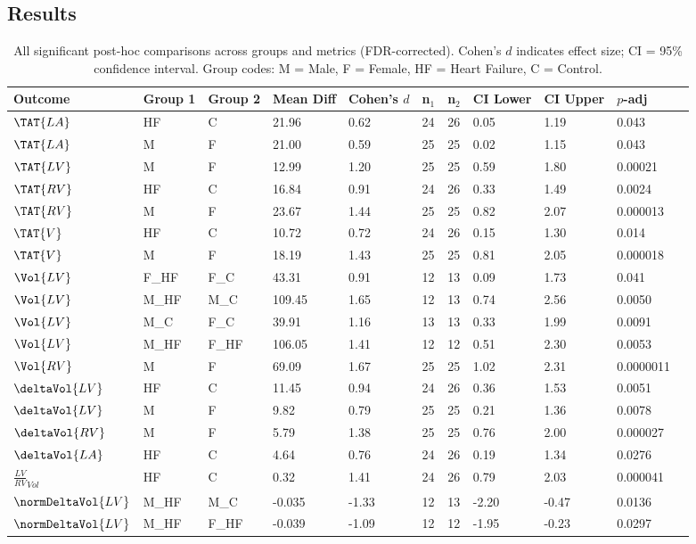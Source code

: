 \subsection{Results}
\begin{landscape}
\begin{table}[ht]
\centering
\caption{All significant post-hoc comparisons across groups and metrics (FDR-corrected). Cohen’s $d$ indicates effect size; CI = 95\% confidence interval. Group codes: M = Male, F = Female, HF = Heart Failure, C = Control.}
\begin{tabular}{lllllllllll}
\toprule
\textbf{Outcome} & \textbf{Group 1} & \textbf{Group 2} & \textbf{Mean Diff} & \textbf{Cohen's $d$} & \textbf{n$_1$} & \textbf{n$_2$} & \textbf{CI Lower} & \textbf{CI Upper} & \textbf{$p$-adj} \\
\midrule
$\TAT{LA}$ & HF & C & 21.96 & 0.62 & 24 & 26 & 0.05 & 1.19 & 0.043 \\
$\TAT{LA}$ & M & F & 21.00 & 0.59 & 25 & 25 & 0.02 & 1.15 & 0.043 \\
$\TAT{LV}$ & M & F & 12.99 & 1.20 & 25 & 25 & 0.59 & 1.80 & 0.00021 \\
$\TAT{RV}$ & HF & C & 16.84 & 0.91 & 24 & 26 & 0.33 & 1.49 & 0.0024 \\
$\TAT{RV}$ & M & F & 23.67 & 1.44 & 25 & 25 & 0.82 & 2.07 & 0.000013 \\
$\TAT{V}$ & HF & C & 10.72 & 0.72 & 24 & 26 & 0.15 & 1.30 & 0.014 \\
$\TAT{V}$ & M & F & 18.19 & 1.43 & 25 & 25 & 0.81 & 2.05 & 0.000018 \\
$\Vol{LV}$ & F\_HF & F\_C & 43.31 & 0.91 & 12 & 13 & 0.09 & 1.73 & 0.041 \\
$\Vol{LV}$ & M\_HF & M\_C & 109.45 & 1.65 & 12 & 13 & 0.74 & 2.56 & 0.0050 \\
$\Vol{LV}$ & M\_C & F\_C & 39.91 & 1.16 & 13 & 13 & 0.33 & 1.99 & 0.0091 \\
$\Vol{LV}$ & M\_HF & F\_HF & 106.05 & 1.41 & 12 & 12 & 0.51 & 2.30 & 0.0053 \\
$\Vol{RV}$ & M & F & 69.09 & 1.67 & 25 & 25 & 1.02 & 2.31 & 0.0000011 \\
$\deltaVol{LV}$ & HF & C & 11.45 & 0.94 & 24 & 26 & 0.36 & 1.53 & 0.0051 \\
$\deltaVol{LV}$ & M & F & 9.82 & 0.79 & 25 & 25 & 0.21 & 1.36 & 0.0078 \\
$\deltaVol{RV}$ & M & F & 5.79 & 1.38 & 25 & 25 & 0.76 & 2.00 & 0.000027 \\
$\deltaVol{LA}$ & HF & C & 4.64 & 0.76 & 24 & 26 & 0.19 & 1.34 & 0.0276 \\
$\frac{LV}{RV}_{Vol}$ & HF & C & 0.32 & 1.41 & 24 & 26 & 0.79 & 2.03 & 0.000041 \\
$\normDeltaVol{LV}$ & M\_HF & M\_C & -0.035 & -1.33 & 12 & 13 & -2.20 & -0.47 & 0.0136 \\
$\normDeltaVol{LV}$ & M\_HF & F\_HF & -0.039 & -1.09 & 12 & 12 & -1.95 & -0.23 & 0.0297 \\
\bottomrule
\end{tabular}
\label{tab:all-significant-comparisons}
\end{table}
\end{landscape}
